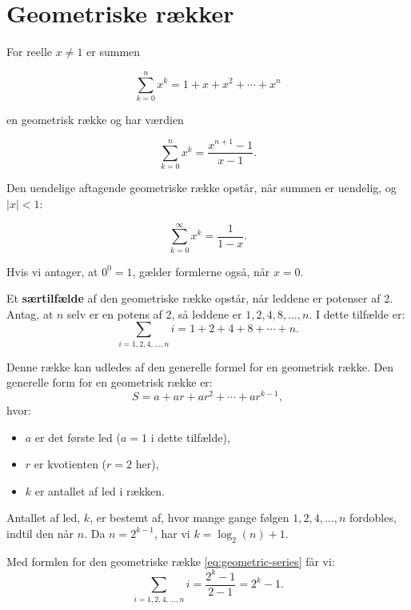         \section*{Geometriske rækker}
        For reelle $x \neq 1$ er summen
        
        \[
            \sum_{k=0}^n x^k=1+x+x^2+\cdots+x^n
        \]
        
        en geometrisk række og har værdien
        
        \begin{equation}
            \sum_{k=0}^n x^k=\frac{x^{n+1}-1}{x-1} . \label{eq:geometric-series}
        \end{equation}
        
        Den uendelige aftagende geometriske række opstår, når summen er uendelig, og $|x|<1$:
        
        \begin{equation}
            \sum_{k=0}^{\infty} x^k=\frac{1}{1-x} . \label{eq:infinite-geometric-series}
        \end{equation}
        
        Hvis vi antager, at $0^0=1$, gælder formlerne også, når $x=0$.
        
        Et \textbf{særtilfælde} af den geometriske række opstår, når leddene er potenser af 2. Antag, at $n$ selv er en potens af 2, så leddene er \(1, 2, 4, 8, \ldots, n\). I dette tilfælde er:
        \[
            \sum_{i=1,2,4,\ldots,n} i = 1 + 2 + 4 + 8 + \cdots + n.
        \]
        
        Denne række kan udledes af den generelle formel for en geometrisk række. Den generelle form for en geometrisk række er:
        \[
            S = a + ar + ar^2 + \cdots + ar^{k-1},
        \]
        hvor:
        \begin{itemize}
            \item \(a\) er det første led (\(a=1\) i dette tilfælde),
            \item \(r\) er kvotienten (\(r=2\) her),
            \item \(k\) er antallet af led i rækken.
        \end{itemize}
        Antallet af led, \(k\), er bestemt af, hvor mange gange følgen \(1, 2, 4, \ldots, n\) fordobles, indtil den når \(n\). Da \(n = 2^{k-1}\), har vi \(k = \log_2(n) + 1\).
        
        Med formlen for den geometriske række \eqref{eq:geometric-series} får vi:
        \[
            \sum_{i=1,2,4,\ldots,n} i = \frac{2^k - 1}{2 - 1} = 2^k - 1.
        \]
        
